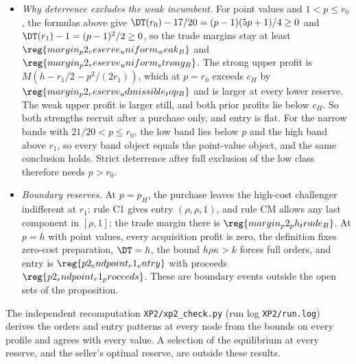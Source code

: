 \begin{itemize}[leftmargin=2em]
\(\reg{margin_p2_reserve_points_rev1_B}\). The point values and the narrow bands give the same objects here, because the
reserve lies above the low band and below the high band. The strong upper profit equals \(c_H\) at
\(p_H=\sqrt{2r_1(h-c_H/M)-r_1^2}\approx\reg{p2_reserve_ph}\), and the weak upper profit equals \(c_H\) at
\(h-c_H/M\approx\reg{p2_reserve_weak_top}\); the reserve lies inside this interval, at distances
\(\reg{margin_p2_deter_lower_B}\) and \(\reg{margin_p2_deter_upper_B}\) from its ends, and \(p_H-r_0=\reg{margin_p2_ph_weak_B}\).
\item \emph{Why deterrence excludes the weak incumbent.} For point values and \(1<p\le r_0\), the formulas above give
\(\DT(r_0)-17/20=(p-1)(5p+1)/4\ge0\) and \(\DT(r_1)-1=(p-1)^2/2\ge0\), so the trade margins stay at least
\(\reg{margin_p2_reserve_uniform_weak_B}\) and \(\reg{margin_p2_reserve_uniform_strong_B}\). The strong upper profit is
\(M(h-r_1/2-p^2/(2r_1))\), which at \(p=r_0\) exceeds \(c_H\) by \(\reg{margin_p2_reserve_admissible_top_B}\) and is larger
at every lower reserve. The weak upper profit is larger still, and both prior profits lie below \(c_H\). So both
strengths recruit after a purchase only, and entry is flat. For the narrow bands with
\(21/20<p\le r_0\), the low band lies below \(p\) and the high band above \(r_1\), so every band object equals the
point-value object, and the same conclusion holds. Strict deterrence after full exclusion of the low class therefore
needs \(p>r_0\).
\item \emph{Boundary reserves.} At \(p=p_H\), the purchase leaves the high-cost challenger indifferent at \(r_1\):
rule C1 gives entry \((\rho,\rho,1)\), and rule CM allows any last component in \([\rho,1]\); the trade margin there is
\(\reg{margin_p2_ph_trade_B}\). At \(p=h\) with point values, every acquisition profit is zero, the definition fixes
zero-cost preparation, \(\DT=h\), the bound \(h\rho\kappa>k\) forces full orders, and entry is
\(\reg{p2_endpoint_r1_entry}\) with proceeds \(\reg{p2_endpoint_r1_proceeds}\). These are boundary events outside the
open sets of the proposition.
\end{itemize}
The independent recomputation \nolinkurl{XP2/xp2_check.py} (run log
\nolinkurl{XP2/run.log}) derives the orders and entry patterns at every node
from the bounds on every profile and agrees with every value. A selection of the equilibrium at every reserve, and the
seller's optimal reserve, are outside these results.
